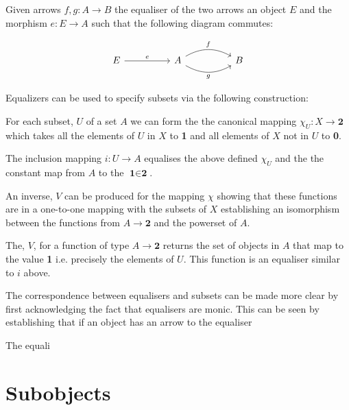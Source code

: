 \documentclass[a4paper,12pt]{article}
\begin{document}
Given arrows $f, g : A \rightarrow B $ the equaliser of the two arrows an object
$E$ and the morphism $e: E \rightarrow A$ such that the following diagram
commutes:

\[\begin{tikzcd}[sep=huge]
    E \arrow[r, "e"] & A \arrow[r, "f", bend left] \arrow[r, "g"', bend right] &
    B
\end{tikzcd}\]

Equalizers can be used to specify subsets via the following construction:

For each subset, $U$ of a set $A$ we can form the the canonical mapping
$\chi_{U}: X \rightarrow \textbf{2}$ which takes all the elements of $U$ in
$X$ to \textbf{1} and all elements of $X$ not in $U$ to \textbf{0}.

The inclusion mapping $i: U \rightarrow A$ equalises the above defined
$\chi_{U}$ and the the constant map from $A$ to the $\textbf{1} \in \textbf{2}$.

An inverse, $V$ can be produced for the mapping $\chi$ showing that these
functions are in a one-to-one mapping with the subsets of $X$ establishing an
isomorphism between the functions from $A \rightarrow \textbf{2}$ and the
powerset of $A$.

The, $V$, for a function of type $A \rightarrow \textbf{2}$ returns the set of
objects in $A$ that map to the value \textbf{1} i.e. precisely the elements of
$U$. This function is an equaliser similar to $i$ above.

The correspondence between equalisers and subsets can be made more clear by
first acknowledging the fact that equalisers are monic. This can be seen by
establishing that if an object has an arrow to the equaliser 

The equali



\section{Subobjects}
\end{document}

